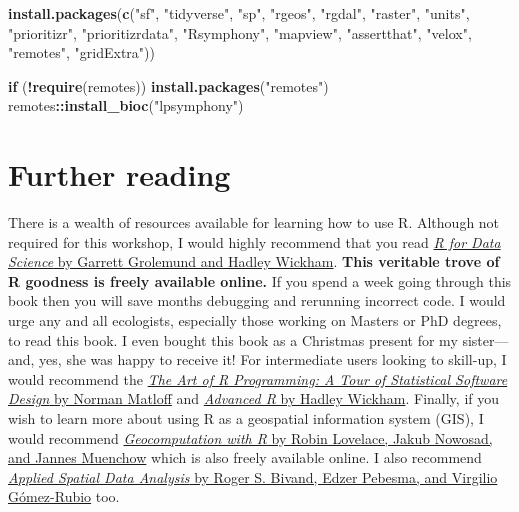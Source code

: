 \documentclass[12pt,]{book}
\newenvironment{Shaded}{\begin{snugshade}}{\end{snugshade}}
\newcommand{\ControlFlowTok}[1]{\textcolor[rgb]{0.13,0.29,0.53}{\textbf{#1}}}
\newcommand{\KeywordTok}[1]{\textcolor[rgb]{0.13,0.29,0.53}{\textbf{#1}}}
\newcommand{\NormalTok}[1]{#1}
\newcommand{\OperatorTok}[1]{\textcolor[rgb]{0.81,0.36,0.00}{\textbf{#1}}}
\newcommand{\StringTok}[1]{\textcolor[rgb]{0.31,0.60,0.02}{#1}}
\begin{document}
\begin{Shaded}
\begin{Highlighting}[]
\KeywordTok{install.packages}\NormalTok{(}\KeywordTok{c}\NormalTok{(}\StringTok{"sf"}\NormalTok{, }\StringTok{"tidyverse"}\NormalTok{, }\StringTok{"sp"}\NormalTok{, }\StringTok{"rgeos"}\NormalTok{, }\StringTok{"rgdal"}\NormalTok{, }\StringTok{"raster"}\NormalTok{,}
                   \StringTok{"units"}\NormalTok{, }\StringTok{"prioritizr"}\NormalTok{, }\StringTok{"prioritizrdata"}\NormalTok{, }\StringTok{"Rsymphony"}\NormalTok{,}
                   \StringTok{"mapview"}\NormalTok{, }\StringTok{"assertthat"}\NormalTok{, }\StringTok{"velox"}\NormalTok{, }\StringTok{"remotes"}\NormalTok{,}
                   \StringTok{"gridExtra"}\NormalTok{))}

\ControlFlowTok{if}\NormalTok{ (}\OperatorTok{!}\KeywordTok{require}\NormalTok{(remotes)) }\KeywordTok{install.packages}\NormalTok{(}\StringTok{"remotes"}\NormalTok{)}
\NormalTok{remotes}\OperatorTok{::}\KeywordTok{install_bioc}\NormalTok{(}\StringTok{"lpsymphony"}\NormalTok{)}
\end{Highlighting}
\end{Shaded}

\hypertarget{further-reading}{%
\section{Further reading}\label{further-reading}}

There is a wealth of resources available for learning how to use R. Although not required for this workshop, I would highly recommend that you read \href{https://r4ds.had.co.nz/}{\emph{R for Data Science} by Garrett Grolemund and Hadley Wickham}. \textbf{This veritable trove of R goodness is freely available online.} If you spend a week going through this book then you will save months debugging and rerunning incorrect code. I would urge any and all ecologists, especially those working on Masters or PhD degrees, to read this book. I even bought this book as a Christmas present for my sister---and, yes, she was happy to receive it! For intermediate users looking to skill-up, I would recommend the \href{http://shop.oreilly.com/product/9781593273842.do}{\emph{The Art of R Programming: A Tour of Statistical Software Design} by Norman Matloff} and \href{https://adv-r.hadley.nz/}{\emph{Advanced R} by Hadley Wickham}. Finally, if you wish to learn more about using R as a geospatial information system (GIS), I would recommend \href{https://geocompr.robinlovelace.net/}{\emph{Geocomputation with R} by Robin Lovelace, Jakub Nowosad, and Jannes Muenchow} which is also freely available online. I also recommend \href{https://www.springer.com/gp/book/9781461476177}{\emph{Applied Spatial Data Analysis} by Roger S. Bivand, Edzer Pebesma, and Virgilio Gómez-Rubio} too.
\end{document}
